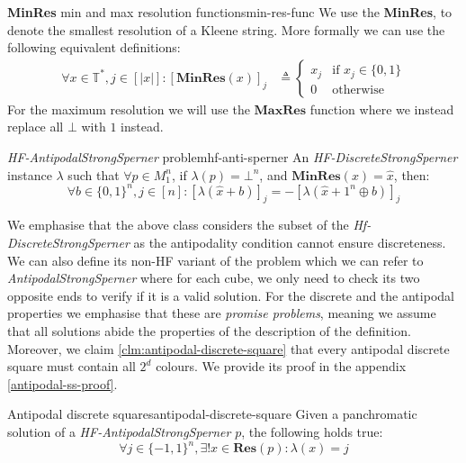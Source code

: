 \begin{definitionbox}{\textbf{MinRes} min and max resolution functions}{min-res-func}
    We use the \textbf{MinRes}, to denote the smallest resolution of a Kleene string. More formally we can use the following equivalent definitions:
    \begin{align*}
        \forall x \in \mathbb{T}^*, j \in [|x|]:  [\textbf{MinRes}(x)]_j
         & \triangleq \begin{cases}
                          x_j & \text{if } x_j \in \{0,1\} \\
                          0   & \text{otherwise}
                      \end{cases}
    \end{align*}
    For the maximum resolution we will use the $\textbf{MaxRes}$ function where we instead replace all $\bot$ with $1$ instead.
\end{definitionbox}

\begin{definitionbox}{\textit{HF-AntipodalStrongSperner} problem}{hf-anti-sperner}
    An \textit{HF-DiscreteStrongSperner} instance $\lambda$ such that $\forall p \in M_1^n$, if $\lambda(p)= \bot^n$,
    and $\textbf{MinRes}(x) = \hat{x}$, then:
    $$
        \forall b \in \{0,1\}^n, j \in [n]: [\lambda(\hat{x} + b)]_j = -[\lambda(\hat{x} +  1^n \oplus b)]_j
    $$
\end{definitionbox}

We emphasise that the above class considers the subset of the \textit{Hf-DiscreteStrongSperner}
as the antipodality condition cannot ensure discreteness. We can also define its non-HF variant
of the problem which we can refer to \textit{AntipodalStrongSperner} where for each cube,
we only need to check its two opposite ends to verify if it is a valid solution.
For the discrete and the antipodal properties we emphasise that these are \textit{promise problems},
meaning we assume that all solutions abide the properties of the description
of the definition. Moreover, we claim \ref{clm:antipodal-discrete-square} that every antipodal discrete square
must contain all $2^d$ colours. We provide its proof in the appendix \ref{antipodal-ss-proof}.


\begin{claimbox}{Antipodal discrete squares}{antipodal-discrete-square}
    Given a panchromatic solution of a \textit{HF-AntipodalStrongSperner} $p$, the following holds true:
    $$
        \forall j \in \{-1, 1\}^n, \exists! x \in \textbf{Res}(p): \lambda(x) =  j
    $$
\end{claimbox}

